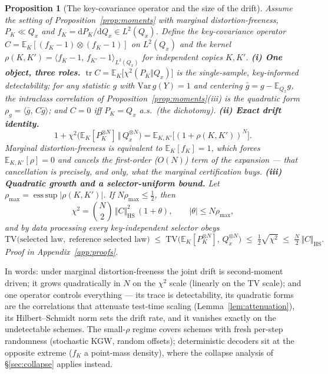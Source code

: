 \documentclass{article} %
\newtheorem{proposition}{Proposition}
\begin{document}
\begin{proposition}[The key-covariance operator and the size of the drift]\label{prop:drift}
Assume the setting of Proposition~\ref{prop:moments} with marginal
distortion-freeness, $P_K\ll Q_x$ and
$f_K=\mathrm dP_K/\mathrm dQ_x\in L^2(Q_x)$. Define the
\emph{key-covariance operator} $C=\mathbb E_K[(f_K-1)\otimes(f_K-1)]$ on
$L^2(Q_x)$ and the kernel
$\rho(K,K')=\langle f_K-1,\,f_{K'}-1\rangle_{L^2(Q_x)}$ for independent
copies $K,K'$.
\textbf{(i) One object, three roles.}
$\operatorname{tr}C=\mathbb E_K\big[\chi^2(P_K\Vert Q_x)\big]$ is the
single-sample, key-informed detectability; for any statistic $g$ with
$\mathrm{Var}\,g(Y)=1$ and centering $\bar g=g-\mathbb E_{Q_x}g$, the
intraclass correlation of Proposition~\ref{prop:moments}(iii) is the
quadratic form $\rho_g=\langle\bar g,\,C\bar g\rangle$; and $C=0$ iff
$P_K=Q_x$ a.s.\ (the dichotomy).
\textbf{(ii) Exact drift identity.}
\[
1+\chi^2\big(\mathbb E_K[P_K^{\otimes N}]\,\big\Vert\,Q_x^{\otimes N}\big)
=\mathbb E_{K,K'}\big[(1+\rho(K,K'))^N\big].
\]
Marginal distortion-freeness is equivalent to $\mathbb E_K[f_K]=1$, which
forces $\mathbb E_{K,K'}[\rho]=0$ and cancels the first-order ($O(N)$)
term of the expansion --- that cancellation is precisely, and only, what the
marginal certification buys.
\textbf{(iii) Quadratic growth and a selector-uniform bound.} Let
$\rho_{\max}=\operatorname{ess\,sup}|\rho(K,K')|$. If
$N\rho_{\max}\le\tfrac12$, then
\[
\chi^2=\binom N2\,\Vert C\Vert_{\mathrm{HS}}^2\,(1+\theta),
\qquad|\theta|\le N\rho_{\max},
\]
and by data processing every key-independent selector obeys
\[
\mathrm{TV}\big(\text{selected law},\;\text{reference selected law}\big)
\;\le\;\mathrm{TV}\big(\mathbb E_K[P_K^{\otimes N}],\,Q_x^{\otimes N}\big)
\;\le\;\tfrac12\sqrt{\chi^2}\;\le\;\tfrac N2\,\Vert C\Vert_{\mathrm{HS}} .
\]
Proof in Appendix~\ref{app:proofs}.
\end{proposition}

In words: under marginal distortion-freeness the joint drift is
second-moment driven; it grows quadratically in $N$ on the $\chi^2$ scale
(linearly on the TV scale); and one operator controls everything ---
its trace is detectability, its quadratic forms are the correlations that
attenuate test-time scaling (Lemma~\ref{lem:attenuation}), its
Hilbert--Schmidt norm sets the drift rate, and it vanishes exactly on the
undetectable schemes. The small-$\rho$ regime covers schemes with fresh
per-step randomness (stochastic KGW, random offsets); deterministic decoders
sit at the opposite extreme ($f_K$ a point-mass density), where the collapse
analysis of \S\ref{sec:collapse} applies instead.
\end{document}
